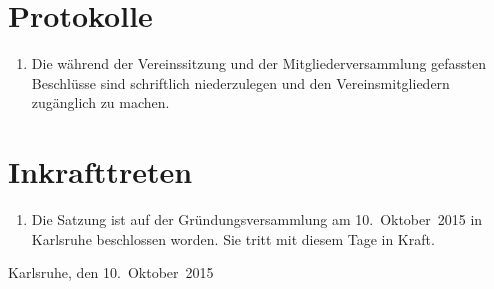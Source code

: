 \documentclass[a4paper]{scrartcl}
\newcommand\Gruendungsdatum{10.~Oktober~2015}
\begin{document}
\section{Protokolle}
\begin{enumerate}
    \item Die während der Vereinssitzung und der Mitgliederversammlung
          gefassten Beschlüsse sind schriftlich niederzulegen und den
          Vereinsmitgliedern zugänglich zu machen.
\end{enumerate}


\section{Inkrafttreten}
\begin{enumerate}
    \item Die Satzung ist auf der Gründungsversammlung am \Gruendungsdatum{} in
          Karlsruhe beschlossen worden. Sie tritt mit diesem Tage in Kraft.
\end{enumerate}


Karlsruhe, den \Gruendungsdatum{}
\end{document}
